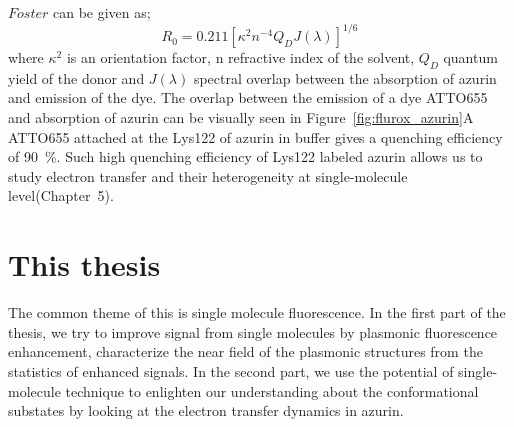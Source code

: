 \documentclass[11pt,a4paper,onecolumn]{article}
\begin{document}
$F\ddot{o}ster$ can be given as;
\begin{equation}
	R_0 = 0.211[\kappa^2n^{-4}Q_DJ(\lambda)]^{1/6}	
\end{equation}
where $\kappa^2$ is an orientation factor, n refractive index of the solvent, $Q_D$ quantum yield of the donor and $J(\lambda)$ spectral overlap between the absorption of azurin and emission of the dye.
The overlap between the emission of a dye ATTO655 and absorption of azurin can be visually seen in Figure~\ref{fig:flurox_azurin}A
ATTO655 attached at the Lys122 of azurin in buffer gives a quenching efficiency of \SI{90}{\percent}.
Such high quenching efficiency of Lys122 labeled azurin allows us to study electron transfer and their heterogeneity at single-molecule level(Chapter~5).

\section{This thesis}
The common theme of this is single molecule fluorescence. In the first part of the thesis, we try to improve signal from single molecules by plasmonic fluorescence enhancement, characterize the near field of the plasmonic structures from the statistics of enhanced signals. In the second part, we use the potential of single-molecule technique to enlighten our understanding about the conformational substates by looking at the electron transfer dynamics in azurin.
\end{document}
